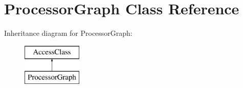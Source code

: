\hypertarget{classProcessorGraph}{\section{Processor\-Graph Class Reference}
\label{classProcessorGraph}
}
Inheritance diagram for Processor\-Graph\-:\begin{figure}[H]
\begin{center}
\leavevmode
\includegraphics[height=2.000000cm]{classProcessorGraph}
\end{center}
\end{figure}
